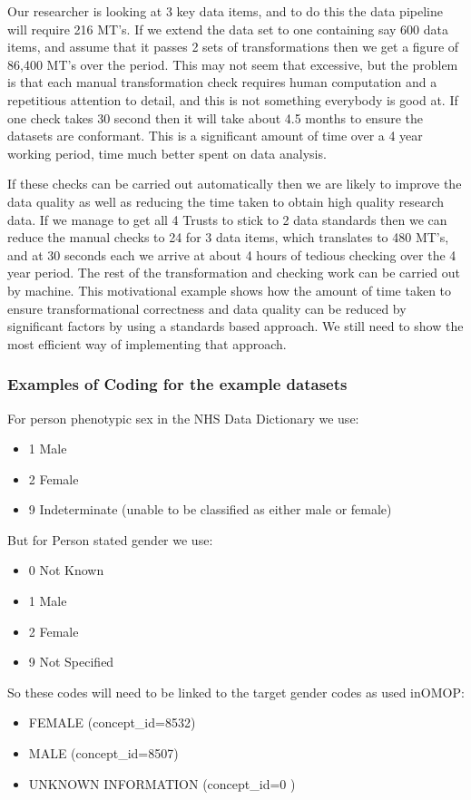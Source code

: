 \documentclass[runningheads]{llncs}
\begin{document}
Our researcher is looking at 3 key data items, and to do this the data pipeline will require 216 MT's. If we extend the data set to one containing say 600 data items, and assume that it passes 2 sets of transformations then we get a figure of 86,400 MT's over the period. This may not seem that excessive, but the problem is that each manual transformation check requires human computation and a repetitious attention to detail, and this is not something everybody is good at. If one check takes 30 second then it will take about 4.5 months to ensure the datasets are conformant. This is a significant amount of time over a 4 year working period, time much better spent on data analysis.  

If these checks can be carried out automatically then we are likely to improve the data quality as well as reducing the time taken to obtain high quality research data. If we manage to get all 4 Trusts to stick to 2 data standards then we can reduce the manual checks to 24 for 3 data items, which translates to 480 MT's, and at 30 seconds each we arrive at about 4 hours of tedious checking over the 4 year period. The rest of the transformation and checking work can be carried out by machine. This motivational example shows how the amount of time taken to ensure transformational correctness and data quality can be reduced by significant factors by using a standards based approach. We still need to show the most efficient way of implementing that approach. 

\subsubsection{Examples of Coding for the example datasets}	

For person phenotypic sex in the NHS Data Dictionary we use:
\begin{itemize}
	\item 1	Male
	\item 2	Female
	\item 9	Indeterminate (unable to be classified as either male or female)
\end{itemize}
But for Person stated gender we use:
\begin{itemize}
	\item 0	Not Known
	\item 1	Male
	\item 2	Female
	\item 9	Not Specified
\end{itemize}
So these codes will need to be linked to the target gender codes as used inOMOP:
\begin{itemize}
	\item FEMALE (concept_id=8532)
	\item MALE (concept_id=8507)
	\item UNKNOWN INFORMATION (concept_id=0 )
\end{itemize}
 
\end{document}

